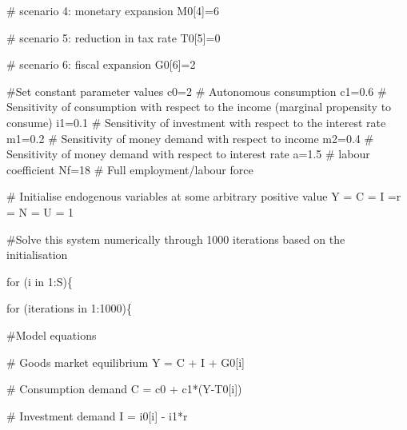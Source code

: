\documentclass[
  letterpaper,
  DIV=11,
  numbers=noendperiod]{scrreprt}
\newenvironment{Shaded}{\begin{snugshade}}{\end{snugshade}}
\newcommand{\CommentTok}[1]{\textcolor[rgb]{0.37,0.37,0.37}{#1}}
\newcommand{\ControlFlowTok}[1]{\textcolor[rgb]{0.00,0.23,0.31}{#1}}
\newcommand{\DecValTok}[1]{\textcolor[rgb]{0.68,0.00,0.00}{#1}}
\newcommand{\FloatTok}[1]{\textcolor[rgb]{0.68,0.00,0.00}{#1}}
\newcommand{\NormalTok}[1]{\textcolor[rgb]{0.00,0.23,0.31}{#1}}
\newcommand{\OtherTok}[1]{\textcolor[rgb]{0.00,0.23,0.31}{#1}}
\newcommand{\SpecialCharTok}[1]{\textcolor[rgb]{0.37,0.37,0.37}{#1}}
\begin{document}
\begin{Shaded}
\begin{Highlighting}[]
\CommentTok{\# scenario 4: monetary expansion }
\NormalTok{M0[}\DecValTok{4}\NormalTok{]}\OtherTok{=}\DecValTok{6}

\CommentTok{\# scenario 5: reduction in tax rate}
\NormalTok{T0[}\DecValTok{5}\NormalTok{]}\OtherTok{=}\DecValTok{0}  

\CommentTok{\# scenario 6: fiscal expansion}
\NormalTok{G0[}\DecValTok{6}\NormalTok{]}\OtherTok{=}\DecValTok{2} 

\CommentTok{\#Set constant parameter values}
\NormalTok{c0}\OtherTok{=}\DecValTok{2}   \CommentTok{\# Autonomous consumption}
\NormalTok{c1}\OtherTok{=}\FloatTok{0.6} \CommentTok{\# Sensitivity of consumption with respect to the income (marginal propensity to consume)}
\NormalTok{i1}\OtherTok{=}\FloatTok{0.1} \CommentTok{\# Sensitivity of investment with respect to the interest rate}
\NormalTok{m1}\OtherTok{=}\FloatTok{0.2} \CommentTok{\# Sensitivity of money demand with respect to income}
\NormalTok{m2}\OtherTok{=}\FloatTok{0.4} \CommentTok{\# Sensitivity of money demand with respect to interest rate}
\NormalTok{a}\OtherTok{=}\FloatTok{1.5}  \CommentTok{\# labour coefficient}
\NormalTok{Nf}\OtherTok{=}\DecValTok{18}  \CommentTok{\# Full employment/labour force}

\CommentTok{\# Initialise endogenous variables at some arbitrary positive value }
\NormalTok{Y }\OtherTok{=}\NormalTok{ C }\OtherTok{=}\NormalTok{ I }\OtherTok{=}\NormalTok{r }\OtherTok{=}\NormalTok{ N }\OtherTok{=}\NormalTok{ U }\OtherTok{=} \DecValTok{1}

\CommentTok{\#Solve this system numerically through 1000 iterations based on the initialisation}

\ControlFlowTok{for}\NormalTok{ (i }\ControlFlowTok{in} \DecValTok{1}\SpecialCharTok{:}\NormalTok{S)\{}
  
  \ControlFlowTok{for}\NormalTok{ (iterations }\ControlFlowTok{in} \DecValTok{1}\SpecialCharTok{:}\DecValTok{1000}\NormalTok{)\{}
    
    \CommentTok{\#Model equations}
    
    \CommentTok{\# Goods market equilibrium}
\NormalTok{    Y }\OtherTok{=}\NormalTok{ C }\SpecialCharTok{+}\NormalTok{ I }\SpecialCharTok{+}\NormalTok{ G0[i]}
    
    \CommentTok{\# Consumption demand}
\NormalTok{    C }\OtherTok{=}\NormalTok{ c0 }\SpecialCharTok{+}\NormalTok{ c1}\SpecialCharTok{*}\NormalTok{(Y}\SpecialCharTok{{-}}\NormalTok{T0[i])}
    
    \CommentTok{\# Investment demand}
\NormalTok{    I }\OtherTok{=}\NormalTok{ i0[i] }\SpecialCharTok{{-}}\NormalTok{ i1}\SpecialCharTok{*}\NormalTok{r}
    

\end{Highlighting}
\end{Shaded}
\end{document}
